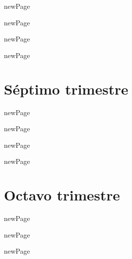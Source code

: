 \documentclass{book}
\begin{document}
\begin{htmlDiv}{newPage}
	
\end{htmlDiv}

\begin{htmlDiv}{newPage}
	
\end{htmlDiv}

\begin{htmlDiv}{newPage}
	
\end{htmlDiv}

\begin{htmlDiv}{newPage}
	
\end{htmlDiv}

\part{Séptimo trimestre}

\begin{htmlDiv}{newPage}
	
\end{htmlDiv}

\begin{htmlDiv}{newPage}
	
\end{htmlDiv}

\begin{htmlDiv}{newPage}
	
\end{htmlDiv}

\begin{htmlDiv}{newPage}	
	
\end{htmlDiv}

\part{Octavo trimestre}

\begin{htmlDiv}{newPage}
	
\end{htmlDiv}

\begin{htmlDiv}{newPage}
	
\end{htmlDiv}

\begin{htmlDiv}{newPage}
	
\end{htmlDiv}
\end{document}
